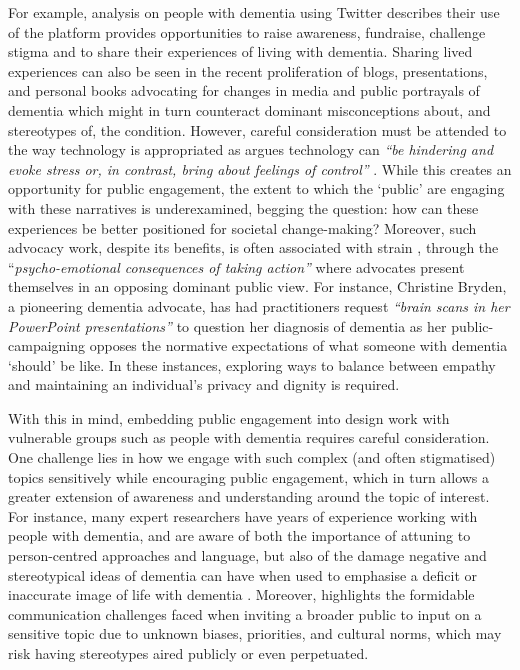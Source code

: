 For example, \cite{talbot_how_2020} analysis on people with dementia using Twitter describes their use of the platform provides opportunities to raise awareness, fundraise, challenge stigma and to share their experiences of living with dementia. Sharing lived experiences can also be seen in the recent proliferation of blogs, presentations, and personal books advocating \citep{bryden_challenging_2020,christine_bryden_dancing_2005,swaffer_dementia_2014} for changes in media and public portrayals of dementia which might in turn counteract dominant misconceptions about, and stereotypes of, the condition. However, careful consideration must be attended to the way technology is appropriated as \cite{lindqvist2018contrasting} argues technology can \textit{“be hindering and evoke stress or, in contrast, bring about feelings of control” }. While this creates an opportunity for public engagement, the extent to which the ‘public’ are engaging with these narratives is underexamined, begging the question: how can these experiences be better positioned for societal change-making? Moreover, such advocacy work, despite its benefits, is often associated with strain \citep{d2020caring}, through the “\textit{psycho-emotional consequences of taking action”} \citep{bartlett_citizenship_2014} where advocates present themselves in an opposing dominant public view. For instance, Christine Bryden, a pioneering dementia advocate, has had practitioners request \textit{“brain scans in her PowerPoint presentations” }\citep{swaffer_but_2016} to question her diagnosis of dementia as her public-campaigning opposes the normative expectations of what someone with dementia ‘should’ be like. In these instances, exploring ways to balance between empathy and maintaining an individual’s privacy and dignity is required.

With this in mind, embedding public engagement into design work with vulnerable groups such as people with dementia requires careful consideration. One challenge lies in how we engage with such complex (and often stigmatised) topics sensitively while encouraging public engagement, which in turn allows a greater extension of awareness and understanding around the topic of interest. For instance, many expert researchers have years of experience working with people with dementia, and are aware of both the importance of attuning to person-centred approaches \citep{fazio_fundamentals_2018} and language, but also of the damage negative and stereotypical ideas of dementia can have when used to emphasise a deficit or inaccurate image of life with dementia \citep{young_expanding_2019}. Moreover, \cite{niederdeppe2008message} highlights the formidable communication challenges faced when inviting a broader public to input on a sensitive topic due to unknown biases, priorities, and cultural norms, which may risk having stereotypes aired publicly or even perpetuated.

